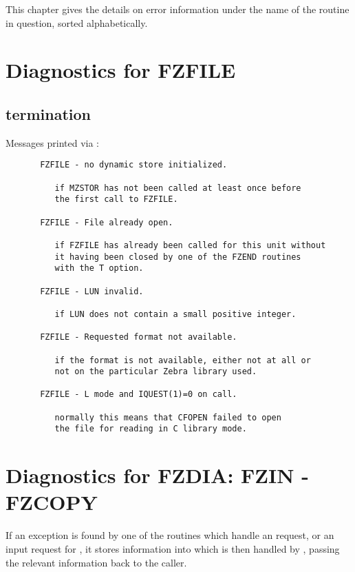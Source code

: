 This chapter gives the details on error information
under the name of the routine in question, sorted alphabetically.

\section{Diagnostics for FZFILE}

\subsection*{ termination}

Messages printed via :

\begin{verbatim}
       FZFILE - no dynamic store initialized.

          if MZSTOR has not been called at least once before
          the first call to FZFILE.

       FZFILE - File already open.

          if FZFILE has already been called for this unit without
          it having been closed by one of the FZEND routines
          with the T option.

       FZFILE - LUN invalid.

          if LUN does not contain a small positive integer.

       FZFILE - Requested format not available.

          if the format is not available, either not at all or
          not on the particular Zebra library used.

       FZFILE - L mode and IQUEST(1)=0 on call.

          normally this means that CFOPEN failed to open
          the file for reading in C library mode.
\end{verbatim}

\section{Diagnostics for FZDIA: FZIN - FZCOPY}


If an exception is found by one of the routines which handle
an  request, or an input request for ,
it stores information into \IQUEST{} which is then handled
by , passing the relevant information back to the caller.

